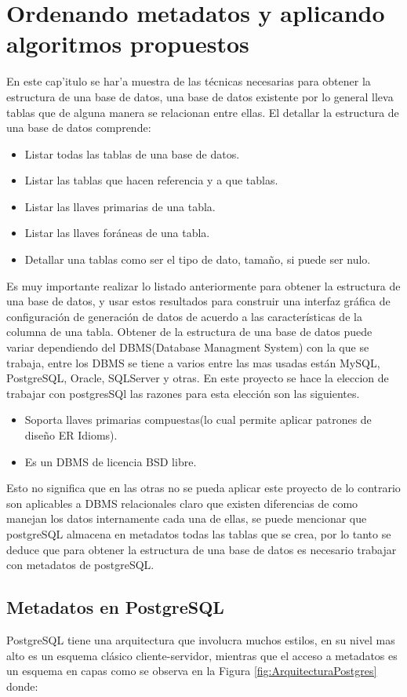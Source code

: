 \chapter{Ordenando metadatos y aplicando algoritmos propuestos}

En este cap'itulo se har'a muestra de las t\'ecnicas necesarias para obtener la estructura de una base de datos, una base de datos existente por lo general lleva tablas que de alguna manera se relacionan entre ellas. El detallar la estructura de una base de datos comprende:
\begin{itemize}
\item Listar todas las tablas de una base de datos.
\item Listar las tablas que hacen referencia y a que tablas.
\item Listar las llaves primarias de una tabla.
\item Listar las llaves for\'aneas de una tabla.
\item Detallar una tablas como ser el tipo de dato, tama\~no, si puede ser nulo. 
\end{itemize} 
Es muy importante realizar lo listado anteriormente para obtener la estructura de una base de datos, y usar estos resultados para construir una interfaz gr\'afica de configuraci\'on de generaci\'on de datos de acuerdo a las caracter\'isticas de la columna de una tabla.
Obtener de la estructura de una base de datos puede variar dependiendo del DBMS(Database Managment System) con la que se trabaja, entre los DBMS se tiene a varios entre las mas usadas est\'an MySQL, PostgreSQL, Oracle, SQLServer y otras. En este proyecto se hace la eleccion de  trabajar con postgresSQl las razones para esta elecci\'on son las siguientes.
\begin{itemize}
\item Soporta llaves primarias compuestas(lo cual permite aplicar patrones de dise\~no ER Idioms).
\item Es un DBMS de licencia BSD libre.
\end{itemize}
Esto no significa que en las otras no se pueda aplicar este proyecto de lo contrario son aplicables a DBMS relacionales claro que existen diferencias de como manejan los datos internamente cada una de ellas, se puede mencionar que postgreSQL almacena en metadatos todas las tablas que se crea, por lo tanto se deduce que para obtener la estructura de una base de datos es necesario trabajar con metadatos de postgreSQL.
\section{Metadatos en PostgreSQL}
PostgreSQL tiene una arquitectura que involucra muchos estilos, en su nivel mas alto es un esquema cl\'asico cliente-servidor, mientras que el acceso a metadatos es un esquema en capas como se observa en la Figura \ref{fig:ArquitecturaPostgres} donde:

